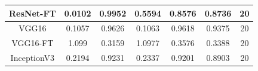 \documentclass[11pt,a4paper]{article}
\theoremstyle{definition}
\begin{document}
\begin{table}[H]
\begin{tabular}{|c|c|c|c|c|c|c|}
\hline
ResNet-FT                                           & \textcolor[rgb]{0.129,0.129,0.129}{0.0102 } & \textcolor[rgb]{0.129,0.129,0.129}{0.9952 } & \textcolor[rgb]{0.129,0.129,0.129}{0.5594 }                                                                       & \textcolor[rgb]{0.129,0.129,0.129}{0.8576}                                                                             & \textcolor[rgb]{0.129,0.129,0.129}{0.8736}                                                                       & 20                                                                                                              \\
\hline
VGG16                                               & \textcolor[rgb]{0.129,0.129,0.129}{0.1057 } & \textcolor[rgb]{0.129,0.129,0.129}{0.9626 } & \textcolor[rgb]{0.129,0.129,0.129}{0.1063 }                                                                       & \textcolor[rgb]{0.129,0.129,0.129}{0.9618}                                                                             & \textcolor[rgb]{0.129,0.129,0.129}{0.9375}                                                                       & 20                                                                                                              \\
\hline
VGG16-FT                                            & \textcolor[rgb]{0.129,0.129,0.129}{1.099}   & \textcolor[rgb]{0.129,0.129,0.129}{0.3159 } & \textcolor[rgb]{0.129,0.129,0.129}{1.0977 }                                                                       & \textcolor[rgb]{0.129,0.129,0.129}{0.3576}                                                                             & \textcolor[rgb]{0.129,0.129,0.129}{0.3388}                                                                       & 20                                                                                                              \\
\hline
InceptionV3                                         & \textcolor[rgb]{0.129,0.129,0.129}{0.2194 } & \textcolor[rgb]{0.129,0.129,0.129}{0.9231 } & \textcolor[rgb]{0.129,0.129,0.129}{0.2337 }                                                                       & \textcolor[rgb]{0.129,0.129,0.129}{0.9201}                                                                             & \textcolor[rgb]{0.129,0.129,0.129}{0.8903}                                                                       & 20                                                                                                              \\

\end{tabular}
\end{table}
\end{document}
